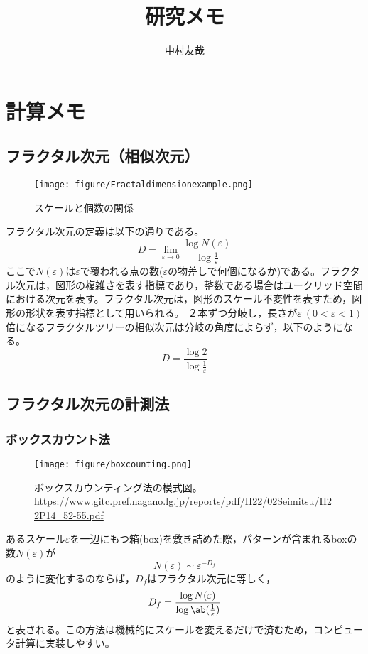 \documentclass{ltjsarticle}
\title{研究メモ}
\author{中村友哉}
\begin{document}
\maketitle
\section{計算メモ}
\subsection{フラクタル次元（相似次元）}
\begin{wrapfigure}{r}[0pt]{0.33\textwidth}
  \begin{center}
    \texttt{[image: figure/Fractaldimensionexample.png]}
  \end{center}
  \caption{スケールと個数の関係}
  \label{fig:相似次元の考え方}
\end{wrapfigure}
フラクタル次元の定義は以下の通りである。
\begin{equation}
  D=\lim_{\varepsilon \to 0}\frac{\log N(\varepsilon)}{\log \frac{1}{\varepsilon}}
\end{equation}
ここで$N(\varepsilon)$は$\varepsilon$で覆われる点の数($\varepsilon$の物差しで何個になるか)である。フラクタル次元は，図形の複雑さを表す指標であり，整数である場合はユークリッド空間における次元を表す。フラクタル次元は，図形のスケール不変性を表すため，図形の形状を表す指標として用いられる。
２本ずつ分岐し，長さが$\varepsilon~(0<\varepsilon<1)$倍になるフラクタルツリーの相似次元は分岐の角度によらず，以下のようになる。
\begin{equation}
  D=\frac{\log 2}{\log \frac{1}{\varepsilon}}
\end{equation}
\subsection{フラクタル次元の計測法}
\subsubsection{ボックスカウント法}
\begin{figure}[H]
  \centering
  \texttt{[image: figure/boxcounting.png]}
  \caption{ボックスカウンティング法の模式図。\\
    \url{https://www.gitc.pref.nagano.lg.jp/reports/pdf/H22/02Seimitsu/H22P14_52-55.pdf}}
\end{figure}
あるスケール$\varepsilon$を一辺にもつ箱(box)を敷き詰めた際，パターンが含まれるboxの数$N(\varepsilon)$が
\begin{equation}
  N(\varepsilon)\sim\varepsilon^{-D_f}
\end{equation}
のように変化するのならば，$D_f$はフラクタル次元に等しく，
\begin{equation}
  D_f=\frac{\log{N(\varepsilon)}}{\log\ab(\frac{1}{\varepsilon})}
\end{equation}
と表される。この方法は機械的にスケールを変えるだけで済むため，コンピュータ計算に実装しやすい。
\end{document}

